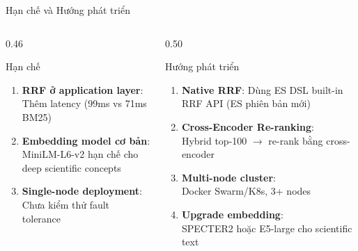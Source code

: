 \begin{frame}{Hạn chế và Hướng phát triển}
\begin{columns}[T]
\begin{column}{0.46\textwidth}

\begin{alertblock}{Hạn chế}
{\small
\begin{enumerate}
    \item \textbf{RRF ở application layer}:\\Thêm latency (99ms vs 71ms BM25)
    \item \textbf{Embedding model cơ bản}:\\MiniLM-L6-v2 hạn chế cho deep scientific concepts
    \item \textbf{Single-node deployment}:\\Chưa kiểm thử fault tolerance
\end{enumerate}
}
\end{alertblock}

\end{column}
\begin{column}{0.50\textwidth}

\begin{exampleblock}{Hướng phát triển}
{\small
\begin{enumerate}
    \item \textbf{Native RRF}: Dùng ES DSL built-in RRF API (ES phiên bản mới)
    \item \textbf{Cross-Encoder Re-ranking}:\\Hybrid top-100 $\to$ re-rank bằng cross-encoder
    \item \textbf{Multi-node cluster}:\\Docker Swarm/K8s, 3+ nodes
    \item \textbf{Upgrade embedding}:\\SPECTER2 hoặc E5-large cho scientific text
\end{enumerate}
}
\end{exampleblock}

\end{column}
\end{columns}
\end{frame}

